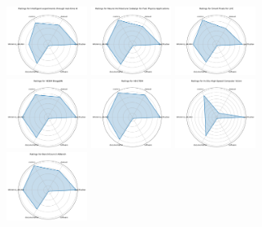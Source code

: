 \documentclass{article}
\begin{document}
\begin{figure}[ht!]
\\[1ex]
\includegraphics[width=0.2333\textwidth]{Intelligent experiments through real-time AI_radar.pdf}
\includegraphics[width=0.2333\textwidth]{Neural Architecture Codesign for Fast Physics Applications_radar.pdf}
\includegraphics[width=0.2333\textwidth]{Smart Pixels for LHC_radar.pdf}
\\[1ex]
\includegraphics[width=0.2333\textwidth]{HEDM BraggNN_radar.pdf}
\includegraphics[width=0.2333\textwidth]{4D-STEM_radar.pdf}
\includegraphics[width=0.2333\textwidth]{In-Situ High-Speed Computer Vision_radar.pdf}
\\[1ex]
\includegraphics[width=0.2333\textwidth]{BenchCouncil AIBench_radar.pdf}

\end{figure}
\end{document}

